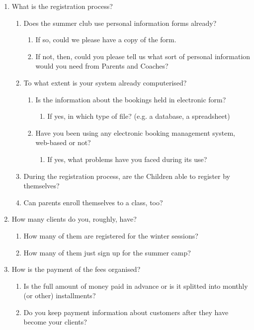 \documentclass{l3proj}
\begin{document}
\begin{enumerate}
\item What is the registration process?
		\begin{enumerate}
	\item Does the summer club use personal information forms already?
			\begin{enumerate}
			\item If so, could we please have a copy of the form.
			\item If not, then, could you please tell us what sort of personal information would you need from Parents and Coaches?
			\end{enumerate}
	\item To what extent is your system already computerised?
			\begin{enumerate}
			\item Is the information about the bookings held in electronic form?
				\begin{enumerate}
				\item If yes, in which type of file? (e.g. a database, a spreadsheet)
				\end{enumerate}
			\item Have you been using any electronic booking management system, web-based or not?
				\begin{enumerate}
				\item If yes, what problems have you faced during its use?
				\end{enumerate}
			\end{enumerate}
	\item During the registration process, are the Children able to register by themselves?
	\item Can parents enroll themselves to a class, too?
	\end{enumerate}
\item How many clients do you, roughly, have?
			\begin{enumerate}
			\item How many of them are registered for the winter sessions?
			\item How many of them just sign up for the summer camp?
			\end{enumerate}
\item How is the payment of the fees organised?
		\begin{enumerate}
		\item Is the full amount of money paid in advance or is it splitted into monthly (or other) installments?
		\item Do you keep payment information about customers after they have become your clients?

\end{enumerate}
\end{enumerate}
\end{document}
